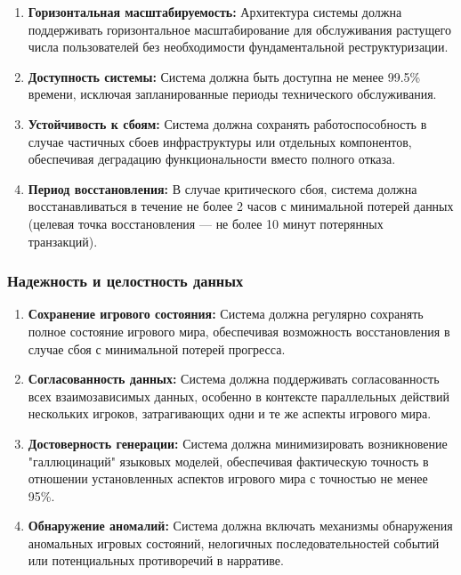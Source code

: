 \begin{enumerate}[label=NFR\arabic*., resume]
    \item \textbf{Горизонтальная масштабируемость:} Архитектура системы должна поддерживать горизонтальное масштабирование для обслуживания растущего числа пользователей без необходимости фундаментальной реструктуризации.

    \item \textbf{Доступность системы:} Система должна быть доступна не менее 99.5\% времени, исключая запланированные периоды технического обслуживания.

    \item \textbf{Устойчивость к сбоям:} Система должна сохранять работоспособность в случае частичных сбоев инфраструктуры или отдельных компонентов, обеспечивая деградацию функциональности вместо полного отказа.

    \item \textbf{Период восстановления:} В случае критического сбоя, система должна восстанавливаться в течение не более 2 часов с минимальной потерей данных (целевая точка восстановления — не более 10 минут потерянных транзакций).
\end{enumerate}

\subsubsection{Надежность и целостность данных}

\begin{enumerate}[label=NFR\arabic*., resume]
    \item \textbf{Сохранение игрового состояния:} Система должна регулярно сохранять полное состояние игрового мира, обеспечивая возможность восстановления в случае сбоя с минимальной потерей прогресса.

    \item \textbf{Согласованность данных:} Система должна поддерживать согласованность всех взаимозависимых данных, особенно в контексте параллельных действий нескольких игроков, затрагивающих одни и те же аспекты игрового мира.

    \item \textbf{Достоверность генерации:} Система должна минимизировать возникновение "галлюцинаций" языковых моделей, обеспечивая фактическую точность в отношении установленных аспектов игрового мира с точностью не менее 95\%.

    \item \textbf{Обнаружение аномалий:} Система должна включать механизмы обнаружения аномальных игровых состояний, нелогичных последовательностей событий или потенциальных противоречий в нарративе.
\end{enumerate}

